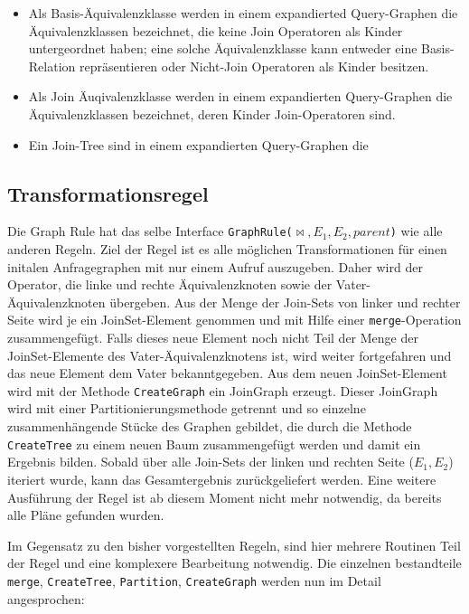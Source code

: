 \begin{itemize}
\item Als Basis-Äquivalenzklasse werden in einem expandierted Query-Graphen die Äquivalenzklassen bezeichnet, die keine Join Operatoren als Kinder untergeordnet haben; eine solche Äquivalenzklasse kann entweder eine Basis-Relation repräsentieren oder Nicht-Join Operatoren als Kinder besitzen.

\item Als Join Äuqivalenzklasse werden in einem expandierten Query-Graphen die Äquivalenzklassen bezeichnet, deren Kinder Join-Operatoren sind.

\item Ein Join-Tree sind in einem expandierten Query-Graphen die 


\end{itemize}


\subsection{Transformationsregel}


Die Graph Rule hat das selbe Interface \texttt{GraphRule($\Join, E_1, E_2, parent$)} wie alle anderen Regeln. Ziel der Regel ist es alle möglichen Transformationen für einen initalen Anfragegraphen mit nur einem Aufruf auszugeben. Daher wird der Operator, die linke und rechte Äquivalenzknoten sowie der Vater-Äquivalenzknoten übergeben. Aus der Menge der Join-Sets von linker und rechter Seite wird je ein JoinSet-Element genommen und mit Hilfe einer \texttt{merge}-Operation zusammengefügt. Falls dieses neue Element noch nicht Teil der Menge der JoinSet-Elemente des Vater-Äquivalenzknotens ist, wird weiter fortgefahren und das neue Element dem Vater bekanntgegeben. Aus dem neuen JoinSet-Element wird mit der Methode \texttt{CreateGraph} ein JoinGraph erzeugt. Dieser JoinGraph wird mit einer Partitionierungsmethode getrennt und so einzelne zusammenhängende Stücke des Graphen gebildet, die durch die Methode \texttt{CreateTree} zu einem neuen Baum zusammengefügt werden und damit ein Ergebnis bilden. Sobald über alle Join-Sets der linken und rechten Seite ($E_1, E_2$) iteriert wurde, kann das Gesamtergebnis zurückgeliefert werden. Eine weitere Ausführung der Regel ist ab diesem Moment nicht mehr notwendig, da bereits alle Pläne gefunden wurden.


Im Gegensatz zu den bisher vorgestellten Regeln, sind hier mehrere Routinen Teil der Regel und eine komplexere Bearbeitung notwendig. Die einzelnen bestandteile \texttt{merge}, \texttt{CreateTree}, \texttt{Partition}, \texttt{CreateGraph} werden nun im Detail angesprochen:


